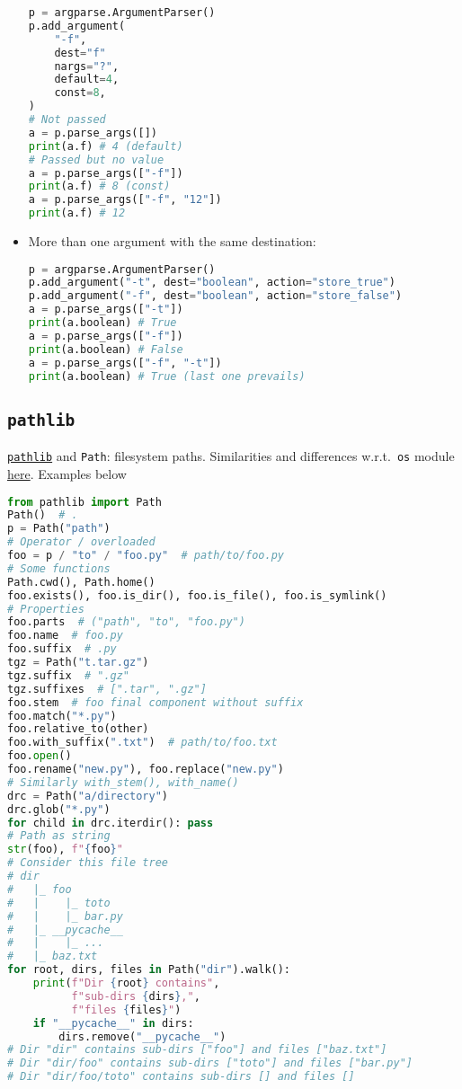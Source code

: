 \documentclass[a4paper,12pt,%
              final%
              ]{article}
\begin{document}
\begin{itemize}
    \begin{center}
    \begin{minipage}[T]{.45\textwidth}
        \begin{lstlisting}[language=python,frame=single]
p = argparse.ArgumentParser()
p.add_argument(
    "-f",
    dest="f"
    nargs="?",
    default=4,
    const=8,
)
# Not passed
a = p.parse_args([])
print(a.f) # 4 (default)
# Passed but no value
a = p.parse_args(["-f"])
print(a.f) # 8 (const)
a = p.parse_args(["-f", "12"])
print(a.f) # 12
        \end{lstlisting}
      \end{minipage}
    \end{center}

  \item More than one argument with the same destination:
\begin{lstlisting}[language=python]
p = argparse.ArgumentParser()
p.add_argument("-t", dest="boolean", action="store_true")
p.add_argument("-f", dest="boolean", action="store_false")
a = p.parse_args(["-t"])
print(a.boolean) # True
a = p.parse_args(["-f"])
print(a.boolean) # False
a = p.parse_args(["-f", "-t"])
print(a.boolean) # True (last one prevails)
\end{lstlisting}
\end{itemize}

\subsection{\texttt{pathlib}}
\href{https://docs.python.org/3/library/pathlib.html}{\texttt{pathlib}} and \texttt{Path}: filesystem paths. Similarities and differences w.r.t.\ \texttt{os} module \href{https://docs.python.org/3/library/pathlib.html#correspondence-to-tools-in-the-os-module}{here}. Examples below
\begin{lstlisting}[language=python]
from pathlib import Path
Path()  # .
p = Path("path")
# Operator / overloaded
foo = p / "to" / "foo.py"  # path/to/foo.py
# Some functions
Path.cwd(), Path.home()
foo.exists(), foo.is_dir(), foo.is_file(), foo.is_symlink()
# Properties
foo.parts  # ("path", "to", "foo.py")
foo.name  # foo.py
foo.suffix  # .py
tgz = Path("t.tar.gz")
tgz.suffix  # ".gz"
tgz.suffixes  # [".tar", ".gz"]
foo.stem  # foo final component without suffix
foo.match("*.py")
foo.relative_to(other)
foo.with_suffix(".txt")  # path/to/foo.txt
foo.open()
foo.rename("new.py"), foo.replace("new.py")
# Similarly with_stem(), with_name()
drc = Path("a/directory")
drc.glob("*.py")
for child in drc.iterdir(): pass
# Path as string
str(foo), f"{foo}"
# Consider this file tree
# dir
#   |_ foo
#   |    |_ toto
#   |    |_ bar.py
#   |_ __pycache__
#   |    |_ ...
#   |_ baz.txt
for root, dirs, files in Path("dir").walk():
    print(f"Dir {root} contains",
          f"sub-dirs {dirs},",
          f"files {files}")
    if "__pycache__" in dirs:
        dirs.remove("__pycache__")
# Dir "dir" contains sub-dirs ["foo"] and files ["baz.txt"]
# Dir "dir/foo" contains sub-dirs ["toto"] and files ["bar.py"]
# Dir "dir/foo/toto" contains sub-dirs [] and files []
\end{lstlisting}
\end{document}
